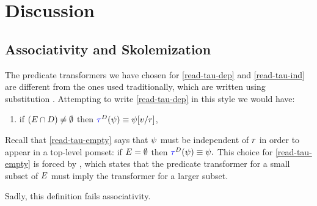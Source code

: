 \section{Discussion}
\label{sec:discussion}

\subsection{Associativity and Skolemization}
\label{sec:ex:assoc}

The predicate transformers we have chosen for \ref{read-tau-dep} and
\ref{read-tau-ind} are different from the ones used traditionally, which are
written using substitution \cite{DBLP:journals/pacmpl/JagadeesanJR20}.  Attempting to write \ref{read-tau-dep} in
this style we would have:
\begin{enumerate}[topsep=0pt]
\item[{\labeltext[\textsc{r}4a$'$]{(\textsc{r}4a$'$)}{read-tau-dep-p}}]
  if $(E\cap D)\neq\emptyset$ then
  \begin{math}
    \aTr{\bEvs}{\bForm} \riff    
    \bForm[\aVal/\aReg]
  \end{math},    
\end{enumerate}
Recall that \ref{read-tau-empty} says that $\psi$ must be independent of
$r$ in order to appear in a top-level pomset: if $E=\emptyset$ then
\begin{math}
  \aTr{\bEvs}{\bForm} \riff
  \bForm.
\end{math}
This choice for \ref{read-tau-empty} is forced by , which
states that the predicate transformer for a small subset of $E$ must
imply the transformer for a larger subset.

Sadly, this definition fails associativity.

